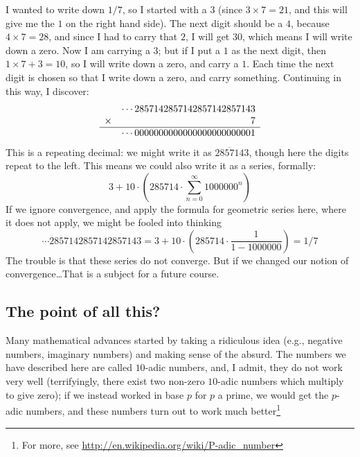 \documentclass[11pt]{article}
\begin{document}
I wanted to write down $1/7$, so I started with a $3$ (since $3 \times
7 = 21$, and this will give me the $1$ on the right hand side).  The
next digit should be a $4$, because $4 \times 7 = 28$, and since I had
to carry that $2$, I will get $30$, which means I will write down a
zero.  Now I am carrying a $3$; but if I put a $1$ as the next digit,
then $1 \times 7 + 3 = 10$, so I will write down a zero, and carry a
$1$.  Each time the next digit is chosen so that I write down a zero,
and carry something.  Continuing in this way, I discover:
$$
\begin{array}{cr}
       & \cdots 2857142857142857142857143 \\
\times &  7 \\
\hline
 & \cdots 0000000000000000000000001 \\
\end{array}
$$
This is a repeating decimal: we might write it as
$\overline{285714}3$, though here the digits repeat to the left.
This means we could also write it as a series, formally:
$$
3 + 10 \cdot \left( 285714 \cdot \sum_{n=0}^\infty 1000000^n \right)
$$
If we ignore convergence, and apply the formula for geometric
series here, where it does not apply, we might be fooled into thinking
$$
\cdots 2857142857142857143 = 3 + 10 \cdot \left( 285714 \cdot \frac{1}{1 - 1000000} \right) = 1/7
$$
The trouble is that these series do not converge.  But if we changed
our notion of convergence\ldots That is a subject for a future course.

\subsection*{The point of all this?}

Many mathematical advances started by taking a ridiculous idea (e.g.,
negative numbers, imaginary numbers) and making sense of the absurd.
The numbers we have described here are called $10$-adic numbers, and,
I admit, they do not work very well (terrifyingly, there exist two
non-zero $10$-adic numbers which multiply to give zero); if we instead
worked in base $p$ for $p$ a prime, we would get the $p$-adic numbers,
and these numbers turn out to work much better\footnote{For more, see
  \url{http://en.wikipedia.org/wiki/P-adic_number}}
\end{document}
